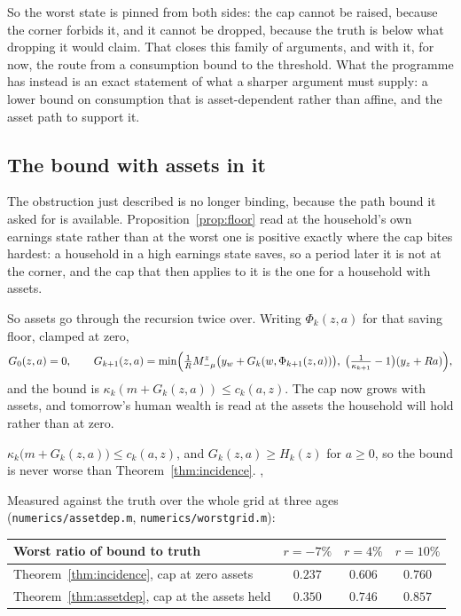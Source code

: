 So the worst state is pinned from both sides: the cap cannot be raised, because the corner forbids
it, and it cannot be dropped, because the truth is below what dropping it would claim. That closes
this family of arguments, and with it, for now, the route from a consumption bound to the
threshold. What the programme has instead is an exact statement of what a sharper argument must
supply: a lower bound on consumption that is asset-dependent rather than affine, and the asset
path to support it.

\subsection{The bound with assets in it}\label{sec:assetdep}

The obstruction just described is no longer binding, because the path bound it asked for is
available. Proposition~\ref{prop:floor} read at the household's own earnings state rather than at
the worst one is positive exactly where the cap bites hardest: a household in a high earnings
state saves, so a period later it is not at the corner, and the cap that then applies to it is the
one for a household with assets.

So assets go through the recursion twice over. Writing $\Phi_k(z,a)$ for that saving floor,
clamped at zero,
\[
  G_0(z,a)=0,\qquad
  G_{k+1}(z,a)=\min\Bigl(\tfrac1R M^z_{-\mu}\bigl(y_w+G_k(w,\Phi_{k+1}(z,a))\bigr),\;
    \bigl(\tfrac1{\kappa_{k+1}}-1\bigr)(y_z+Ra)\Bigr),
\]
and the bound is $\kappa_k(m+G_k(z,a))\le c_k(a,z)$. The cap now grows with assets, and tomorrow's
human wealth is read at the assets the household will hold rather than at zero.

\begin{theorem}\label{thm:assetdep}
$\kappa_k\bigl(m+G_k(z,a)\bigr)\le c_k(a,z)$, and $G_k(z,a)\ge H_k(z)$ for $a\ge0$, so the bound is
never worse than Theorem~\ref{thm:incidence}.
,
\end{theorem}

Measured against the truth over the whole grid at three ages
(\texttt{numerics/assetdep.m}, \texttt{numerics/worstgrid.m}):

\begingroup\small
\begin{center}
\begin{tabular}{@{}lccc@{}}
\toprule
Worst ratio of bound to truth & $r=-7\%$ & $r=4\%$ & $r=10\%$\\
\midrule
Theorem~\ref{thm:incidence}, cap at zero assets & $0.237$ & $0.606$ & $0.760$\\
Theorem~\ref{thm:assetdep}, cap at the assets held & $0.350$ & $0.746$ & $0.857$\\
\bottomrule
\end{tabular}
\end{center}
\endgroup

